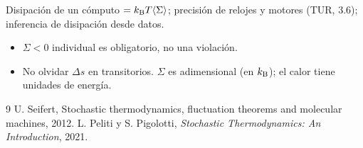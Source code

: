 \documentclass[11pt,a4paper]{article}
\begin{document}
\begin{aplicacion}
Disipación de un cómputo $=k_{\mathrm B} T\langle\Sigma\rangle$; precisión de relojes y motores (TUR, 3.6); inferencia de disipación desde datos.
\end{aplicacion}

\begin{error}
\begin{itemize}[nosep]
\item $\Sigma<0$ individual es obligatorio, no una violación.
\item No olvidar $\Delta s$ en transitorios. \quad $\Sigma$ es adimensional (en $k_{\mathrm B}$); el calor tiene unidades de energía.
\end{itemize}
\end{error}

\begin{thebibliography}{9}\small
{} U. Seifert, Stochastic thermodynamics, fluctuation theorems and molecular machines, 2012.
 L. Peliti y S. Pigolotti, \emph{Stochastic Thermodynamics: An Introduction}, 2021.
\end{thebibliography}
\end{document}
